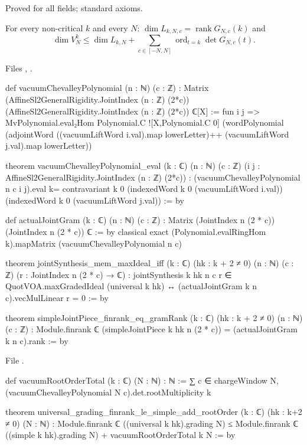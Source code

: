 \begin{status}
Proved for all fields; standard axioms.
\end{status}

\begin{theorem}\label{l20:thm:rootbound}
For every non-critical $k$ and every $N$: $\dim L_{k,N,c}=\operatorname{rank}G_{N,c}(k)$ and
\begin{equation*}
\dim V^k_N\le\dim L_{k,N}+\sum_{c\in[-N,N]}\operatorname{ord}_{t=k}\det G_{N,c}(t).
\end{equation*}
\end{theorem}
\noindent Files ,
.
\begin{leancode}
def vacuumChevalleyPolynomial (n : ℕ) (c : ℤ) :
    Matrix (AffineSl2GeneralRigidity.JointIndex (n : ℤ) (2*c))
      (AffineSl2GeneralRigidity.JointIndex (n : ℤ) (2*c)) ℂ[X] := fun i j =>
  MvPolynomial.eval₂Hom Polynomial.C ![X,Polynomial.C 0]
    (wordPolynomial (adjointWord ((vacuumLiftWord i.val).map lowerLetter)++
      (vacuumLiftWord j.val).map lowerLetter))

theorem vacuumChevalleyPolynomial_eval (k : ℂ) (n : ℕ) (c : ℤ)
    (i j : AffineSl2GeneralRigidity.JointIndex (n : ℤ) (2*c)) :
    (vacuumChevalleyPolynomial n c i j).eval k=
      contravariant k 0 (indexedWord k 0 (vacuumLiftWord i.val))
        (indexedWord k 0 (vacuumLiftWord j.val)) := by

def actualJointGram (k : ℂ) (n : ℕ) (c : ℤ) :
    Matrix (JointIndex n (2 * c)) (JointIndex n (2 * c)) ℂ := by
  classical
  exact (Polynomial.evalRingHom k).mapMatrix (vacuumChevalleyPolynomial n c)

theorem jointSynthesis_mem_maxIdeal_iff (k : ℂ) (hk : k + 2 ≠ 0)
    (n : ℕ) (c : ℤ) (r : JointIndex n (2 * c) → ℂ) :
    jointSynthesis k hk n c r ∈ QuotVOA.maxGradedIdeal (universal k hk) ↔
      (actualJointGram k n c).vecMulLinear r = 0 := by

theorem simpleJointPiece_finrank_eq_gramRank (k : ℂ) (hk : k + 2 ≠ 0)
    (n : ℕ) (c : ℤ) :
    Module.finrank ℂ (simpleJointPiece k hk n (2 * c)) = (actualJointGram k n c).rank := by
\end{leancode}
\noindent File .
\begin{leancode}
def vacuumRootOrderTotal (k : ℂ) (N : ℕ) : ℕ :=
  ∑ c ∈ chargeWindow N, (vacuumChevalleyPolynomial N c).det.rootMultiplicity k

theorem universal_grading_finrank_le_simple_add_rootOrder (k : ℂ) (hk : k+2 ≠ 0)
    (N : ℕ) :
    Module.finrank ℂ ((universal k hk).grading N) ≤
      Module.finrank ℂ ((simple k hk).grading N) + vacuumRootOrderTotal k N := by
\end{leancode}

